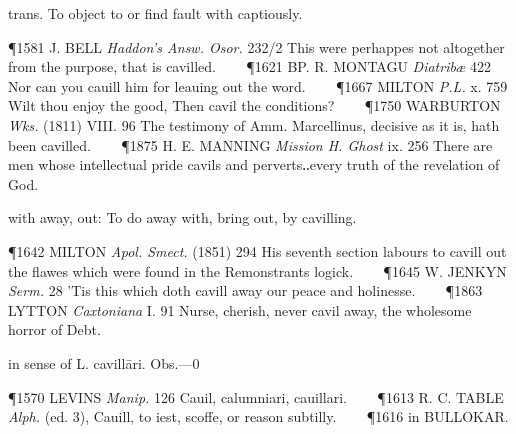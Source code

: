 \begin{description}[wide, labelwidth=!, labelindent=0pt]
\begin{myenumerate}
 trans. To object to or find fault with captiously.

\P 1581 J. BELL  \textit{Haddon's Answ. Osor.} 232/2 This were perhappes not altogether from the purpose, that is cavilled.    
\P 1621 BP. R. MONTAGU  \textit{Diatribæ} 422 Nor can you cauill him for leauing out the word.    
\P 1667 MILTON  \textit{P.L.} x. 759 Wilt thou enjoy the good, Then cavil the conditions?    
\P 1750 WARBURTON  \textit{Wks.} (1811) VIII. 96 The testimony of Amm. Marcellinus, decisive as it is, hath been cavilled.    
\P 1875 H. E. MANNING  \textit{Mission H. Ghost} ix. 256 There are men whose intellectual pride cavils and perverts‥every truth of the revelation of God.

 with away, out: To do away with, bring out, by cavilling.

\P 1642 MILTON  \textit{Apol. Smect.} (1851) 294 His seventh section labours to cavill out the flawes which were found in the Remonstrants logick.    
\P 1645 W. JENKYN  \textit{Serm.} 28 'Tis this which doth cavill away our peace and holinesse.    
\P 1863 LYTTON  \textit{Caxtoniana} I. 91 Nurse, cherish, never cavil away, the wholesome horror of Debt.

 in sense of L. cavillāri. Obs.—0

\P 1570 LEVINS  \textit{Manip.} 126 Cauil, calumniari, cauillari.    
\P 1613 R. C. TABLE  \textit{Alph.} (ed. 3), Cauill, to iest, scoffe, or reason subtilly.    
\P 1616 in BULLOKAR.
\end{myenumerate}









\end{description}
